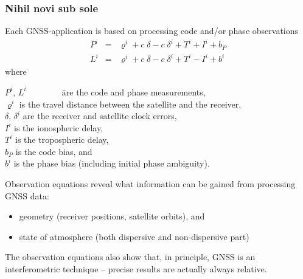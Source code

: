 \documentclass[10pt]{beamer}
\begin{document}
\begin{frame}
\frametitle{Nihil novi sub sole}

Each GNSS-application is based on processing code and/or phase observations
\vspace*{-3mm}
  \begin{eqnarray*}
  P^i & = & \varrho^i + c\;\delta - c\;\delta^i + T^i + I^i + b_P              \\
  L^i & = & \varrho^i + c\;\delta - c\;\delta^i + T^i - I^i + b^i
  \end{eqnarray*}
  where
  \begin{tabbing}
  $P^i$, $L^i$ ~~~~~~~ \= are the code and phase measurements, \\ 
  $\varrho^i$          \> is the travel distance between the satellite 
                          and the receiver,                               \\
  $\delta$, $\delta^i$ \> are the receiver and satellite clock errors,    \\
  $I^i$                \> is the ionospheric delay,                       \\
  $T^i$                \> is the tropospheric delay,                      \\
  $b_P$                \> is the code bias, and                           \\
  $b^i$                \> is the phase bias (including initial
                          phase ambiguity).
  \end{tabbing}
Observation equations reveal what information can be gained from processing GNSS data:
\begin{itemize}
\item geometry (receiver positions, satellite orbits), and
\item state of atmosphere (both dispersive and non-dispersive part)
\end{itemize}
The observation equations also show that, in principle, GNSS is an
\textcolor{blue!90}{interferometric} technique -- precise results are actually always relative.

\end{frame}

\end{document}
